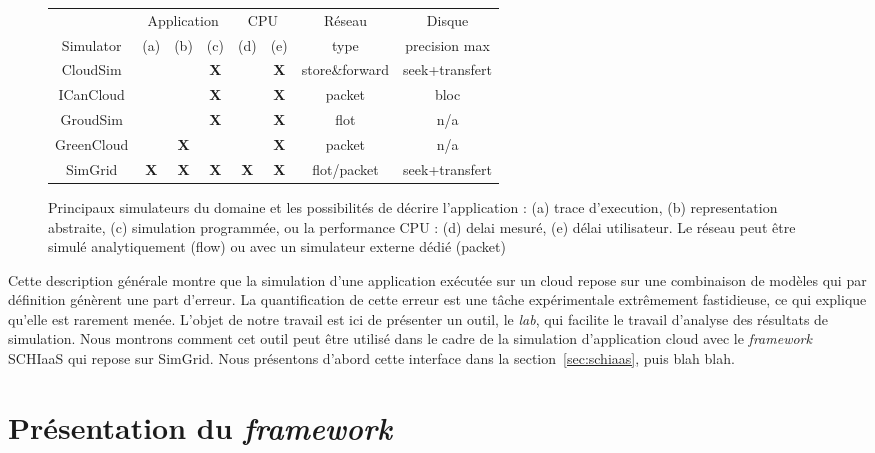 \documentclass[parallelisme]{compas2017}
\begin{document}
\begin{figure}[hbt]
\begin{tabular}{|c||c|c|c||c|c|c|c|}
	\hline
	& \multicolumn{3}{c|}{Application} &
	\multicolumn{2}{c|}{CPU}&Réseau&Disque\\
	\cline{2-8}
	Simulator &(a) 
                  &(b)
                  &(c)
                  &(d)
                  &(e)&
	type & precision max\\
	\hline
	CloudSim & & & \bf X &&\bf
	X&store\&forward&seek+transfert\\ \hline
	ICanCloud & & & \bf X &&\bf X&packet& bloc \\ \hline
	GroudSim & & & \bf X &&\bf X&flot& n/a\\\hline
	GreenCloud & & \bf X &&&\bf X&packet& n/a\\ \hline
	SimGrid & \bf X & \bf X & \bf X &\bf X&\bf X& flot/packet &
	seek+transfert \\
	\hline
\end{tabular}
\caption{Principaux simulateurs du domaine et les possibilités de décrire
  l'application : (a) trace d'execution, (b) representation abstraite, (c) simulation
  programmée, ou la performance CPU : (d) delai mesuré, (e) délai
  utilisateur. Le réseau peut être simulé analytiquement (flow) ou avec un
  simulateur externe dédié (packet)}
\label{fig:sim-features}
\end{figure}

Cette description générale montre que la simulation d'une application exécutée
sur un cloud repose sur une combinaison de modèles qui par définition génèrent
une part d'erreur. La quantification de cette erreur est une tâche expérimentale
extrêmement fastidieuse, ce qui explique qu'elle est rarement menée. L'objet
de notre travail est ici de présenter un outil, le \emph{lab}, qui facilite
le travail d'analyse des résultats de simulation. Nous montrons comment cet 
outil peut être utilisé dans le cadre de la simulation d'application cloud
avec le \textit{framework} SCHIaaS qui repose sur SimGrid. Nous présentons 
d'abord cette interface dans la section~\ref{sec:schiaas}, puis blah blah.





\section{Présentation du \textit{framework}}
\end{document}

